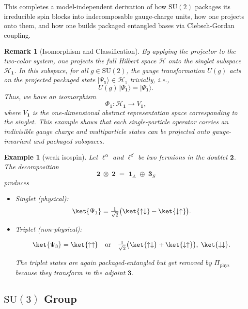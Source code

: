 \documentclass[12pt,a4paper]{article}
\newtheorem{remark}{Remark}
\newtheorem{example}{Example}
\begin{document}
\bigskip
\noindent
This completes a model-independent derivation of how $\mathrm{SU}(2)$ packages its irreducible spin blocks into indecomposable gauge-charge units, how one projects onto them, and how one builds packaged entangled bases via Clebsch-Gordan coupling.




\begin{remark}[Isomorphism and Classification]
	By applying the projector to the two-color system, one projects the full Hilbert space $\mathcal{H}$ onto the singlet subspace $\mathcal{H}_{\mathbf{1}}$.
	In this subspace, for all $g\in\mathrm{SU}(2)$, the gauge transformation $U(g)$ acts on the projected packaged state $|\Psi_{\mathbf{1}}\rangle \in \mathcal{H}_1$ trivially, i.e.,
	\[
	U(g)\,|\Psi_{\mathbf{1}}\rangle = |\Psi_{\mathbf{1}}\rangle.
	\]
	Thus, we have an isomorphism
	\[
	\Phi_{\mathbf{1}}: \mathcal{H}_{\mathbf{1}} \to V_{\mathbf{1}},
	\]
	where $V_{\mathbf{1}}$ is the one-dimensional abstract representation space corresponding to the singlet.
	This example shows that each single-particle operator carries an indivisible gauge charge and multiparticle states can be projected onto gauge-invariant and packaged subspaces.
\end{remark}


\begin{example}[weak isospin]	
	Let $\ell^{\alpha}$ and $\ell^{\beta}$ be two fermions in the doublet $\mathbf 2$.
	The decomposition	
	$$
	\mathbf 2\;\otimes\;\mathbf 2
	\;=\;
	\mathbf 1_A\;\oplus\;\mathbf 3_S
	$$	
	produces
	\begin{itemize}
		\item Singlet (physical):
		$$
		\ket{\Psi_{1}} =\tfrac1{\sqrt2}\bigl(
		\ket{\uparrow\downarrow}-\ket{\downarrow\uparrow}
		\bigr).
		$$
		
		\item Triplet (non-physical):
		
		$$
		\ket{\Psi_{3}} =\ket{\uparrow\uparrow}
		\quad\text{or}\quad
		\tfrac1{\sqrt2}\bigl(
		\ket{\uparrow\downarrow}+\ket{\downarrow\uparrow}
		\bigr),\;
		\ket{\downarrow\downarrow}.
		$$
		
		The triplet states are again packaged-entangled but get removed by $\Pi_{\text{phys}}$ because they transform in the adjoint $\mathbf 3$.
	\end{itemize}
\end{example}



\subsection{$\mathrm{SU}(3)$ Group}
\label{SEC:SU3Packaging}
\end{document}
